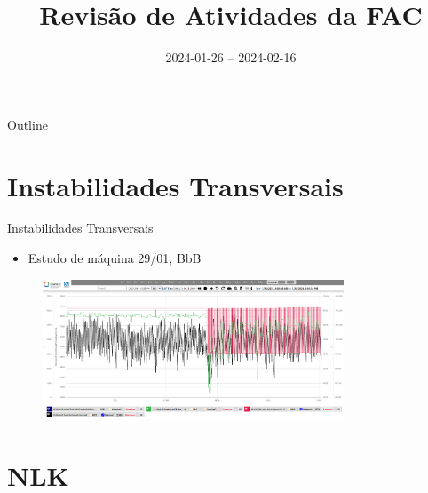 \documentclass{beamer}					  %
\title{Revisão de Atividades da FAC}	%
\institute{LNLS.DAC.FAC}				%
\date{2024-01-26 -- 2024-02-16}			%
\begin{document}
\begin{frame}
  \titlepage
  \href{https://github.com/lnls-fac/doc-review-dac-fac}{}
  \href{https://www.overleaf.com/read/sbdjxtzfchrm}{}
\end{frame}

\begin{frame}{Outline}
  \tableofcontents
\end{frame}




\section{Instabilidades Transversais}

\begin{frame}{Instabilidades Transversais}
    \scriptsize{\begin{itemize}
            \item Estudo de máquina 29/01, BbB
    \end{itemize}}
    \begin{figure}[H]
        	\centering
            \includegraphics[width=0.8\textwidth]{2024-02-16/figures/pu-standby.png}
            \label{fig:pu-standby}
    \end{figure} 
\end{frame}



\section{NLK}
\end{document}
